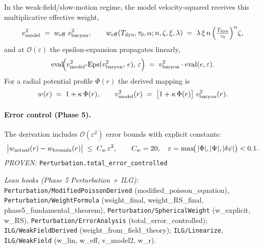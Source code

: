 \documentclass[12pt,a4paper]{article}
\begin{document}
In the weak-field/slow-motion regime, the model velocity-squared receives this multiplicative effective weight,
\begin{equation}
  v_{\rm model}^2 \;=\; w_{\rm eff}\;v_{\rm baryon}^2,
  \qquad
  w_{\rm eff}(T_{\rm dyn},\tau_0,\alpha;n,\zeta,\xi,\lambda)
  \;=\;\lambda\,\xi\,n\,\Bigl(\tfrac{T_{\rm dyn}}{\tau_0}\Bigr)^{\alpha}\zeta,
  \label{eq:weakfield-weight}
\end{equation}
and at \(\mathcal{O}(\varepsilon)\) the epsilon-expansion propagates linearly,
\begin{equation}
  \mathrm{eval}\!\Bigl(v_{\rm model}^2\text{-}\mathrm{Eps}(v_{\rm baryon}^2,\,e),\,\varepsilon\Bigr)
  \;=\; v_{\rm baryon}^2\cdot \mathrm{eval}(e,\varepsilon).
  \label{eq:weakfield-eps}
\end{equation}
For a radial potential profile \(\Phi(r)\) the derived mapping is
\begin{equation}
  w(r)\;=\;1+\kappa\,\Phi(r),\qquad
  v_{\rm model}^2(r) \;=\; \bigl[1+\kappa\,\Phi(r)\bigr]\;v_{\rm baryon}^2(r).
  \label{eq:weakfield-radial}
\end{equation}

\paragraph{Error control (Phase 5).} The derivation includes \(\mathcal{O}(\varepsilon^2)\) error bounds with explicit constants:
\begin{equation}
  \bigl|w_{\rm actual}(r) - w_{\rm formula}(r)\bigr| \;\leq\; C_w\,\varepsilon^2,
  \qquad C_w = 20,\quad \varepsilon = \max\!\bigl(\,|\Phi|,|\Psi|,|\delta\psi|\bigr) < 0.1.
  \label{eq:weight-error-bound}
\end{equation}
\hfill\emph{PROVEN:} \texttt{Perturbation.total\_error\_controlled}

\emph{Lean hooks (Phase 5 Perturbation + ILG):}
\texttt{Perturbation/ModifiedPoissonDerived} (modified\_poisson\_equation),
\texttt{Perturbation/WeightFormula} (weight\_final, weight\_RS\_final, phase5\_fundamental\_theorem),
\texttt{Perturbation/SphericalWeight} (w\_explicit, w\_RS),
\texttt{Perturbation/ErrorAnalysis} (total\_error\_controlled);
\texttt{ILG/WeakFieldDerived} (weight\_from\_field\_theory);
\texttt{ILG/Linearize}, \texttt{ILG/WeakField} (w\_lin, w\_eff, v\_model2, w\_r).
\end{document}
